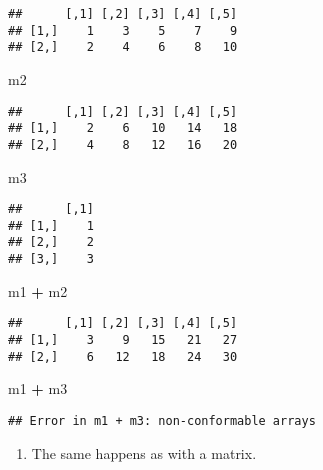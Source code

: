 \documentclass[
]{article}
\newenvironment{Shaded}{\begin{snugshade}}{\end{snugshade}}
\newcommand{\NormalTok}[1]{#1}
\newcommand{\OperatorTok}[1]{\textcolor[rgb]{0.81,0.36,0.00}{\textbf{#1}}}
\newcommand{\StringTok}[1]{\textcolor[rgb]{0.31,0.60,0.02}{#1}}
\providecommand{\tightlist}{%
  \setlength{\itemsep}{0pt}\setlength{\parskip}{0pt}}
\begin{document}
\begin{verbatim}
##      [,1] [,2] [,3] [,4] [,5]
## [1,]    1    3    5    7    9
## [2,]    2    4    6    8   10
\end{verbatim}

\begin{Shaded}
\begin{Highlighting}[]
\NormalTok{m2}
\end{Highlighting}
\end{Shaded}

\begin{verbatim}
##      [,1] [,2] [,3] [,4] [,5]
## [1,]    2    6   10   14   18
## [2,]    4    8   12   16   20
\end{verbatim}

\begin{Shaded}
\begin{Highlighting}[]
\NormalTok{m3}
\end{Highlighting}
\end{Shaded}

\begin{verbatim}
##      [,1]
## [1,]    1
## [2,]    2
## [3,]    3
\end{verbatim}

\begin{Shaded}
\begin{Highlighting}[]
\NormalTok{m1 }\OperatorTok{+}\StringTok{ }\NormalTok{m2}
\end{Highlighting}
\end{Shaded}

\begin{verbatim}
##      [,1] [,2] [,3] [,4] [,5]
## [1,]    3    9   15   21   27
## [2,]    6   12   18   24   30
\end{verbatim}

\begin{Shaded}
\begin{Highlighting}[]
\NormalTok{m1 }\OperatorTok{+}\StringTok{ }\NormalTok{m3}
\end{Highlighting}
\end{Shaded}

\begin{verbatim}
## Error in m1 + m3: non-conformable arrays
\end{verbatim}

\begin{enumerate}
\def\labelenumi{\arabic{enumi}.}
\setcounter{enumi}{1}
\tightlist
\item
  The same happens as with a matrix.
\end{enumerate}
\end{document}
